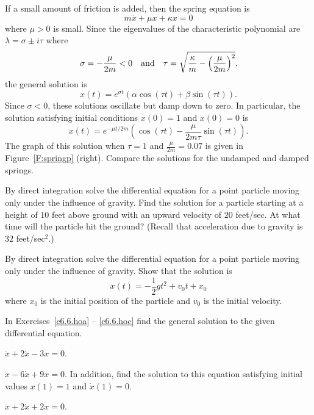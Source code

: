 \documentclass{ximera}
\begin{document}
If a small amount of friction is added, then the spring equation is
\[
m\ddot{x} + \mu \dot{x} +\kappa x = 0
\]
where $\mu>0$ is small.  Since the eigenvalues of the characteristic
polynomial are $\lambda=\sigma\pm i\tau$ where
\[
\sigma = -\frac{\mu}{2m} < 0 \quad\mbox{and}\quad \tau =\sqrt{\frac{\kappa}{m}
-\left(\frac{\mu}{2m}\right)^2},
\]
the general solution is
\[
x(t) = e^{\sigma t}(\alpha\cos(\tau t) + \beta\sin(\tau t)).
\]
Since $\sigma<0$, these solutions oscillate but damp down to zero.  In
particular, the solution satisfying initial conditions $x(0)=1$ and
$\dot{x}(0)=0$ is
\[
x(t) = e^{-\mu t/2m}
\left(\cos(\tau t)-\frac{\mu}{2m\tau}\sin(\tau t)\right).
\]
The graph of this solution when $\tau=1$ and $\frac{\mu}{2m}=0.07$ is
given in Figure~\ref{F:springp} (right).  Compare the solutions for the
undamped and damped springs.

\EXER

\TEXER

\begin{exercise} \label{c6.7.1}
By direct integration solve the differential equation 
for a point particle moving only under the influence of gravity.  Find the
solution for a particle starting at a height of $10$ feet above ground with
an upward velocity of $20$ feet/sec.  At what time will the particle hit
the ground?  (Recall that acceleration due to gravity is $32$ feet/sec$^2$.)
\end{exercise}

\begin{exercise} \label{c6.7.2}
By direct integration solve the differential equation 
for a point particle moving only under the influence of gravity.  Show
that the solution is
\[
x(t) = -\frac{1}{2}gt^2 + v_0t + x_0
\]
where $x_0$ is the initial position of the particle and $v_0$ is the initial
velocity.
\end{exercise}

\noindent  In Exercises~\ref{c6.6.hoa} -- \ref{c6.6.hoc} find the general
solution to the given differential equation.
\begin{exercise} \label{c6.6.hoa}
$\ddot{x} + 2\dot{x} - 3x = 0$.
\end{exercise}
\begin{exercise} \label{c6.6.hob}
$\ddot{x} - 6\dot{x} + 9x = 0$.
In addition, find the solution to this equation satisfying
initial values $x(1)=1$ and $\dot{x}(1)=0$.
\end{exercise}
\begin{exercise} \label{c6.6.hoc}
$\ddot{x} + 2\dot{x} + 2x = 0$.
\end{exercise}
\end{document}
